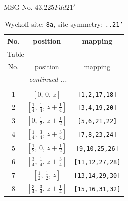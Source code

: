 \documentclass[fleqn,8pt]{jsarticle}
\begin{document}
\setcounter{MaxMatrixCols}{32}

\renewcommand{\tablename}{Table~}
\renewcommand{\figurename}{Figure~}
\begin{center}
\LARGE
MSG No. 43.225\quad$Fdd21'$
\end{center}
\renewcommand{\arraystretch}{1.2}
\begin{longtable}{ccc}
\caption{Wyckoff site: {\tt 8a}, site symmetry: {\tt ..21'}}
 \\
 \hline \hline
No. & position & mapping \\ \hline \endfirsthead

\multicolumn{2}{l}{\tablename\ \thetable{}} \\
 \hline \hline
No. & position & mapping \\ \hline \endhead

 \hline \hline
\multicolumn{2}{r}{\footnotesize\it continued ...} \\ \endfoot

 \hline \hline
\multicolumn{2}{r}{} \\ \endlastfoot

1 & $\left[ 0,\, 0,\, z \right]$ & {\tt [1,2,17,18]} \\ \hline
2 & $\left[ \frac{1}{4},\, \frac{1}{4},\, z + \frac{1}{4} \right]$ & {\tt [3,4,19,20]} \\ \hline
3 & $\left[ 0,\, \frac{1}{2},\, z + \frac{1}{2} \right]$ & {\tt [5,6,21,22]} \\ \hline
4 & $\left[ \frac{1}{4},\, \frac{3}{4},\, z + \frac{3}{4} \right]$ & {\tt [7,8,23,24]} \\ \hline
5 & $\left[ \frac{1}{2},\, 0,\, z + \frac{1}{2} \right]$ & {\tt [9,10,25,26]} \\ \hline
6 & $\left[ \frac{3}{4},\, \frac{1}{4},\, z + \frac{3}{4} \right]$ & {\tt [11,12,27,28]} \\ \hline
7 & $\left[ \frac{1}{2},\, \frac{1}{2},\, z \right]$ & {\tt [13,14,29,30]} \\ \hline
8 & $\left[ \frac{3}{4},\, \frac{3}{4},\, z + \frac{1}{4} \right]$ & {\tt [15,16,31,32]} \\
\end{longtable}
\renewcommand{\arraystretch}{1.2}
\end{document}
